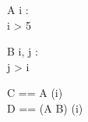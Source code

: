 \begin{schema}{A}
	i : \nat \\
\where
	i > 5 
\end{schema}

\begin{schema}{B}
	i, j : \nat \\
\where	
	j > i \\
\end{schema}

\begin{zed}
	C == A \hide (i) \\
	D == (A \land B) \hide (i) \\
\end{zed}